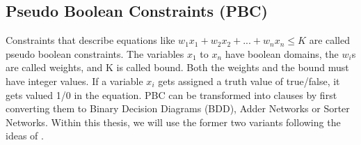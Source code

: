 \subsection{Pseudo Boolean Constraints (PBC)}
Constraints that describe equations like $w_1x_1+w_2x_2+...+w_nx_n \leq K$ are called pseudo boolean constraints. The variables $x_1$ to $x_n$ have boolean domains, the $w_i$s are called weights, and K is called bound. Both the weights and the bound must have integer values. If a variable $x_i$ gets assigned a truth value of true/false, it gets valued 1/0 in the equation. PBC can be transformed into clauses by first converting them to Binary Decision Diagrams (BDD), Adder Networks or Sorter Networks. Within this thesis, we will use the former two variants following the ideas of \cite{Een2006TranslatingPC}.

